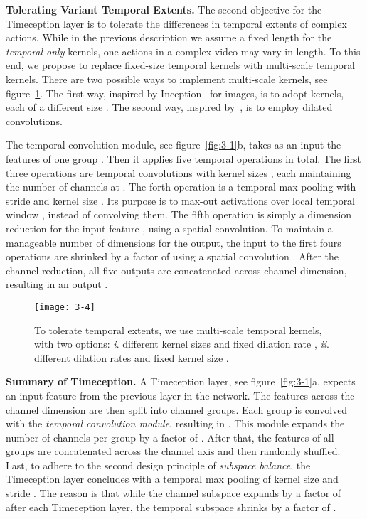 \documentclass[10pt,twocolumn,letterpaper]{article}
\newcommand{\partitle}[1]{\noindent\textbf{#1}}
\begin{document}
\partitle{Tolerating Variant Temporal Extents.}
The second objective for the Timeception layer is to tolerate the differences in temporal extents of complex actions.
While in the previous description we assume a fixed length for the \emph{temporal-only} kernels, one-actions in a complex video may vary in length.
To this end, we propose to replace fixed-size temporal kernels with multi-scale temporal kernels.
There are two possible ways to implement multi-scale kernels, see figure~\ref{fig:3-4}.
The first way, inspired by Inception~\cite{szegedy2015going} for images, is to adopt  kernels, each of a different size .
The second way, inspired by~\cite{van2016wavenet}, is to employ dilated convolutions.

The temporal convolution module, see figure~\ref{fig:3-1}{\color{red}b}, takes as an input the features of one group . Then it applies five temporal operations in total.
The first three operations are temporal convolutions with kernel sizes , each maintaining the number of channels at .
The forth operation is a temporal max-pooling with stride  and kernel size .
Its purpose is to max-out activations over local temporal window , instead of convolving them.
The fifth operation is simply a dimension reduction for the input feature , using a  spatial convolution.
To maintain a manageable number of dimensions for the output, the input to the first fours operations are shrinked by a factor of  using a  spatial convolution .
After the channel reduction, all five outputs are concatenated across channel dimension, resulting in an output .

\begin{figure}[!ht]
\begin{center}
\texttt{[image: 3-4]}
\end{center}
\caption{To tolerate temporal extents, we use multi-scale temporal kernels, with two options:
\textit{i}. different kernel sizes  and fixed dilation rate ,
\textit{ii}. different dilation rates  and fixed kernel size .}
\label{fig:3-4}
\vspace*{-5mm}
\end{figure}

\partitle{Summary of Timeception.}
A Timeception layer, see figure~\ref{fig:3-1}{\color{red}a}, expects an input feature  from the previous layer in the network.
The features  across the channel dimension are then split into  channel groups.
Each group  is convolved with the \emph{temporal convolution module}, resulting in .
This module expands the number of channels per group by a factor of .
After that, the features of all groups  are concatenated across the channel axis and then randomly shuffled.
Last, to adhere to the second design principle of \emph{subspace balance}, the Timeception layer concludes with a temporal max pooling of kernel size  and stride .
The reason is that while the channel subspace expands by a factor of  after each Timeception layer, the temporal subspace shrinks by a factor of .
\end{document}
